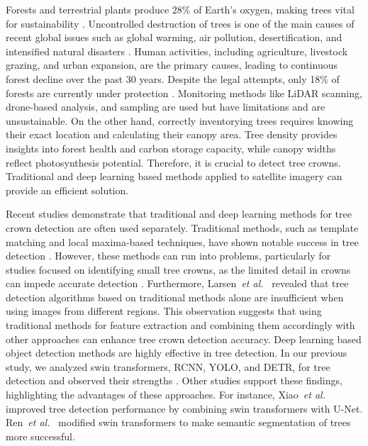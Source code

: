 \documentclass{article}
\begin{document}
Forests and terrestrial plants produce $28\%$ of Earth's oxygen, making trees vital for sustainability \cite{GFRA}. Uncontrolled destruction of trees is one of the main causes of recent global issues such as global warming, air pollution, desertification, and intensified natural disasters \cite{forest_climate_change, forest_carbon_emission}. Human activities, including agriculture, livestock grazing, and urban expansion, are the primary causes, leading to continuous forest decline over the past 30 years. Despite the legal attempts, only 18\% of forests are currently under protection \cite{GFRA, brazilian_law, turkey_law_1, turkey_law_2}. Monitoring methods like LiDAR scanning, drone-based analysis, and sampling are used but have limitations and are unsustainable. On the other hand, correctly inventorying trees requires knowing their exact location and calculating their canopy area. Tree density provides insights into forest health and carbon storage capacity, while canopy widths reflect photosynthesis potential. Therefore, it is crucial to detect tree crowns. Traditional and deep learning based methods applied to satellite imagery can provide an efficient solution.

Recent studies demonstrate that traditional and deep learning methods for tree crown detection are often used separately. Traditional methods, such as template matching and local maxima-based techniques, have shown notable success in tree detection \cite{Korpela20032006, huo2020individual}. However, these methods can run into problems, particularly for studies focused on identifying small tree crowns, as the limited detail in crowns can impede accurate detection \cite{Korpela20032006}. Furthermore, Larsen~\emph{et al.}~\cite{larsen2011comparison} revealed that tree detection algorithms based on traditional methods alone are insufficient when using images from different regions. This observation suggests that using traditional methods for feature extraction and combining them accordingly with other approaches can enhance tree crown detection accuracy. Deep learning based object detection methods are highly effective in tree detection. In our previous study, we analyzed swin transformers, RCNN, YOLO, and DETR, for tree detection and observed their strengths \cite{durgut2025multi}. Other studies support these findings, highlighting the advantages of these approaches. For instance, Xiao~\emph{et al.}~\cite{xiao2023csswin} improved tree detection performance by combining swin transformers with U-Net. Ren~\emph{et al.}~\cite{ren2024local} modified swin transformers to make semantic segmentation of trees more successful.
\end{document}
